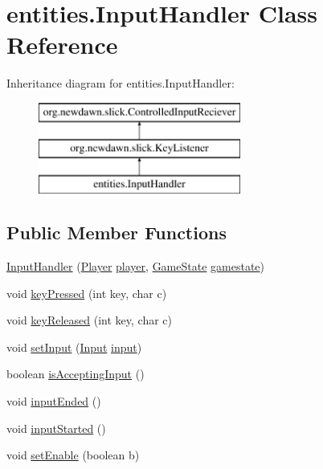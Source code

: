 \hypertarget{classentities_1_1_input_handler}{}\section{entities.\+Input\+Handler Class Reference}
\label{classentities_1_1_input_handler}
Inheritance diagram for entities.\+Input\+Handler\+:\begin{figure}[H]
\begin{center}
\leavevmode
\includegraphics[height=3.000000cm]{classentities_1_1_input_handler}
\end{center}
\end{figure}
\subsection*{Public Member Functions}
\begin{DoxyCompactItemize}
\item 
\mbox{\hyperlink{classentities_1_1_input_handler_a02a9317f35d6371983e903ef348e445a}{Input\+Handler}} (\mbox{\hyperlink{classentities_1_1_player}{Player}} \mbox{\hyperlink{classentities_1_1_input_handler_a65bea2d31684e8d91db9ffef9268f9e9}{player}}, \mbox{\hyperlink{classstates_1_1_game_state}{Game\+State}} \mbox{\hyperlink{classentities_1_1_input_handler_a9f4e32826b3780c5310530d3db807df1}{gamestate}})
\item 
void \mbox{\hyperlink{classentities_1_1_input_handler_a9e9d7c64bd18e93dfb7d8247ab635036}{key\+Pressed}} (int key, char c)
\item 
void \mbox{\hyperlink{classentities_1_1_input_handler_a2716ee43b20accd25e37268ac67c5488}{key\+Released}} (int key, char c)
\item 
void \mbox{\hyperlink{classentities_1_1_input_handler_ad3a1eb35970a169a68b3c01246562a3e}{set\+Input}} (\mbox{\hyperlink{classorg_1_1newdawn_1_1slick_1_1_input}{Input}} \mbox{\hyperlink{classentities_1_1_input_handler_a924ff1658e32e10d77694adf4856b26f}{input}})
\item 
boolean \mbox{\hyperlink{classentities_1_1_input_handler_a3b0b01f1e82200097d90346ebe12e369}{is\+Accepting\+Input}} ()
\item 
void \mbox{\hyperlink{classentities_1_1_input_handler_ab5b8a1ac155983d92cdbbfa2e592654b}{input\+Ended}} ()
\item 
void \mbox{\hyperlink{classentities_1_1_input_handler_a3c2427c9f129a71286d592bf75dcb99f}{input\+Started}} ()
\item 
void \mbox{\hyperlink{classentities_1_1_input_handler_ac47130ba472782e616b9332f442320d2}{set\+Enable}} (boolean b)
\end{DoxyCompactItemize}

